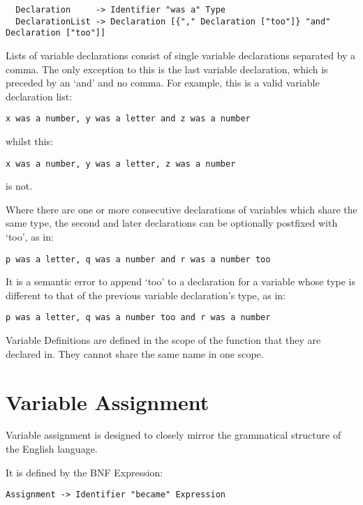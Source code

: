 \documentclass[a4wide, 11pt]{article}
\begin{document}
\begin{verbatim}
  Declaration     -> Identifier "was a" Type
  DeclarationList -> Declaration [{"," Declaration ["too"]} "and" Declaration ["too"]]
\end{verbatim}

Lists of variable declarations consist of single variable declarations separated by a comma. The only exception to this is the last variable declaration, which is preceded by an `and' and no comma. For example, this is a valid variable declaration list:

\begin{verbatim}
x was a number, y was a letter and z was a number
\end{verbatim}

whilst this:

\begin{verbatim}
x was a number, y was a letter, z was a number
\end{verbatim}

is not.

Where there are one or more consecutive declarations of variables which share the same type, the second and later declarations can be optionally postfixed with `too', as in:

\begin{verbatim}
p was a letter, q was a number and r was a number too
\end{verbatim}

It is a semantic error to append `too' to a declaration for a variable whose type is different to that of the previous variable declaration's type, as in:

\begin{verbatim}
p was a letter, q was a number too and r was a number
\end{verbatim}

Variable Definitions are defined in the scope of the function that they are declared in. They cannot share the same name in one scope.

\section{Variable Assignment}

Variable assignment is designed to closely mirror the grammatical structure of the English language.

It is defined by the BNF Expression:

\begin{verbatim}
Assignment -> Identifier "became" Expression
\end{verbatim}
\end{document}
